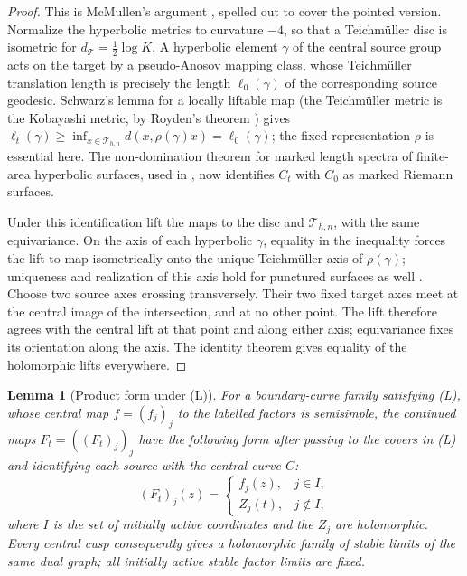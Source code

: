 \documentclass[11pt]{article}
\newcommand{\T}{\mathcal T}
\newtheorem{lemma}[theorem]{Lemma}
\theoremstyle{remark}
\begin{document}
\begin{proof}
This is McMullen's argument \cite{McMullen}, spelled out to
cover the pointed version. Normalize the hyperbolic metrics
to curvature \(-4\), so that a Teichm\"uller disc is isometric
for \(d_{\T}=\frac12\log K\). A hyperbolic element \(\gamma\) of
the central source group acts on the target by a pseudo-Anosov
mapping class, whose Teichm\"uller translation length is precisely
the length \(\ell_0(\gamma)\) of the corresponding source geodesic.
Schwarz's lemma for a locally liftable map (the Teichm\"uller
metric is the Kobayashi metric, by Royden's theorem
\cite[Section 7(A)]{BersFinite}) gives
\(\ell_t(\gamma)\geq\inf_{x\in\T_{h,n}}d(x,\rho(\gamma)x)
=\ell_0(\gamma)\); the fixed representation \(\rho\) is essential
here. The non-domination theorem for marked length spectra of
finite-area hyperbolic surfaces, used in \cite{McMullen}, now
identifies \(C_t\) with \(C_0\) as marked Riemann surfaces.

Under this identification lift the maps to the disc and
\(\T_{h,n}\), with the same equivariance. On the axis of each
hyperbolic \(\gamma\), equality in the inequality forces
the lift to map isometrically onto the unique Teichm\"uller axis
of \(\rho(\gamma)\); uniqueness and realization of this axis hold
for punctured surfaces as well
\cite[Theorem 2.1 and its following remark]{Tanigawa}.
Choose two source axes crossing transversely. Their two fixed
target axes meet at the central image of the intersection, and
at no other point. The lift therefore agrees with the central
lift at that point and along either axis; equivariance fixes its
orientation along the axis. The identity theorem gives equality
of the holomorphic lifts everywhere.
\end{proof}

\begin{lemma}[Product form under (L)]\label{lem:curve}
For a boundary-curve family satisfying (L), whose central map
\(f=(f_j)_j\) to the labelled factors is semisimple, the continued
maps \(F_t=((F_t)_j)_j\) have the following form after passing
to the covers in (L) and identifying each source with the central
curve \(C\):
\begin{equation}\label{eq:product}
 (F_t)_j(z)=
 \begin{cases}
 f_j(z),&j\in I,\\
 Z_j(t),&j\notin I,
 \end{cases}
\end{equation}
where \(I\) is the set of initially active coordinates and the
\(Z_j\) are holomorphic. Every central cusp consequently gives a
holomorphic family of stable limits of the same dual graph; all
initially active stable factor limits are fixed.
\end{lemma}
\end{document}
